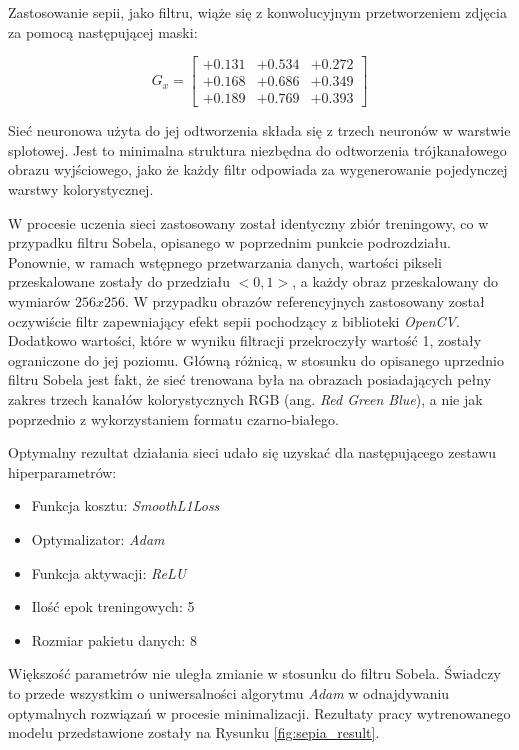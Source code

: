     Zastosowanie sepii, jako filtru, wiąże się z konwolucyjnym przetworzeniem
    zdjęcia za pomocą następującej maski:

    \begin{equation}
    G_x =
    \begin{bmatrix}
    +0.131 & +0.534 & +0.272 \\
    +0.168 & +0.686 & +0.349 \\
    +0.189 & +0.769 & +0.393
    \end{bmatrix}
  \end{equation}

    Sieć neuronowa użyta do jej odtworzenia składa się z trzech neuronów w
    warstwie splotowej. Jest to minimalna struktura niezbędna do odtworzenia
    trójkanałowego obrazu wyjściowego, jako że każdy filtr odpowiada za wygenerowanie
    pojedynczej warstwy kolorystycznej.

    W procesie uczenia sieci zastosowany został identyczny zbiór treningowy, co w
    przypadku filtru Sobela, opisanego w poprzednim punkcie podrozdziału. Ponownie, w ramach
    wstępnego przetwarzania danych, wartości pikseli przeskalowane zostały do przedziału
    $<0,1>$, a każdy obraz przeskalowany do wymiarów $256x256$. W przypadku obrazów
    referencyjnych zastosowany został oczywiście filtr zapewniający efekt sepii
    pochodzący z biblioteki \textit{OpenCV}. Dodatkowo wartości, które w wyniku filtracji
    przekroczyły wartość 1, zostały ograniczone do jej poziomu. Główną różnicą, w stosunku
    do opisanego uprzednio filtru Sobela jest fakt, że sieć trenowana była na
    obrazach posiadających pełny zakres trzech kanałów kolorystycznych RGB
    (ang. \textit{Red Green Blue}), a nie jak
    poprzednio z wykorzystaniem formatu czarno-białego.

    Optymalny rezultat działania sieci udało się uzyskać dla następującego
    zestawu hiperparametrów:

    \begin{itemize}
    \item Funkcja kosztu: \textit{SmoothL1Loss}
    \item Optymalizator: \textit{Adam}
    \item Funkcja aktywacji: \textit{ReLU}
    \item Ilość epok treningowych: 5
    \item Rozmiar pakietu danych: 8
    \end{itemize}

    Większość parametrów nie uległa zmianie w stosunku do filtru Sobela. Świadczy to
    przede wszystkim o uniwersalności algorytmu \textit{Adam} w odnajdywaniu optymalnych
    rozwiązań w procesie minimalizacji. Rezultaty pracy wytrenowanego modelu przedstawione
    zostały na Rysunku \ref{fig:sepia_result}.

